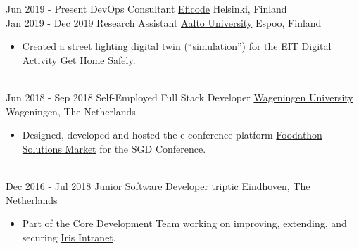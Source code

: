 \documentclass[a4paper]{twentysecondcv} %
\begin{document}
\begin{twentyshort} %
    \twentyitem
    	{Jun 2019 -}
		{Present}
        {DevOps Consultant}
		{\href{https://eficode.com}{Eficode}}
        {Helsinki, Finland}
        {%
        }
        \\
    \twentyitem
    	{Jan 2019 -}
		{Dec 2019}
        {Research Assistant}
		{\href{https://www.aalto.fi/en}{Aalto University}}
        {Espoo, Finland}
        {
        \begin{itemize}
			\item Created a street lighting digital twin (``simulation'') for the EIT Digital Activity \href{https://cyphylab.chora.tu-berlin.de/gethomesafely/}{Get Home Safely}.
        \end{itemize}
        }
        \\
    \twentyitem
    	{Jun 2018 -}
		{Sep 2018}
        {Self-Employed Full Stack Developer}
		{\href{https://wur.nl/en}{Wageningen University}}
        {Wageningen, The Netherlands}
        {
        \begin{itemize}
			\item Designed, developed and hosted the e-conference platform \href{https://foodathon.github.io/}{Foodathon Solutions Market} for the SGD Conference.
        \end{itemize}
        }
        \\
    \twentyitem
    	{Dec 2016 -}
		{Jul 2018}
        {Junior Software Developer}
		{\href{https://www.triptic.nl/}{triptic}}
        {Eindhoven, The Netherlands}
        {
        \begin{itemize}
            \item Part of the Core Development Team working on improving, extending, and securing \href{https://www.irisintranet.com/}{Iris Intranet}.
        \end{itemize}
        }
\end{twentyshort}

\end{document}

